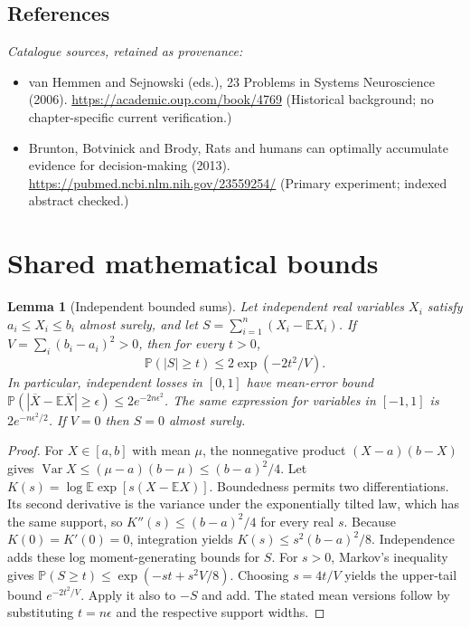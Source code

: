 \documentclass[11pt]{article}
\newcommand{\E}{\mathbb E}
\newcommand{\Prob}{\mathbb P}
\DeclareMathOperator{\Var}{Var}
\providecommand{\E}{\mathbb E}
\providecommand{\Prob}{\mathbb P}
\providecommand{\Var}{\operatorname{Var}}
\newtheorem{sharedlemma}{Lemma}[section]
\begin{document}
\subsection{References}
\noindent\emph{Catalogue sources, retained as provenance:}
\begin{itemize}
\item van Hemmen and Sejnowski (eds.), 23 Problems in Systems Neuroscience (2006). \url{https://academic.oup.com/book/4769} (Historical background; no chapter-specific current verification.)
\item Brunton, Botvinick and Brody, Rats and humans can optimally accumulate evidence for decision-making (2013). \url{https://pubmed.ncbi.nlm.nih.gov/23559254/} (Primary experiment; indexed abstract checked.)
\end{itemize}
\clearpage


\appendix
\section{Shared mathematical bounds}\label{app:bounds}
\begin{sharedlemma}[Independent bounded sums]\label{lem:bounded}
Let independent real variables $X_i$ satisfy $a_i\leq X_i\leq b_i$ almost surely,
and let $S=\sum_{i=1}^n(X_i-\E X_i)$. If
$V=\sum_i(b_i-a_i)^2>0$, then for every $t>0$,
\[
 \Prob(|S|\geq t)\leq 2\exp(-2t^2/V).
\]
In particular, independent losses in $[0,1]$ have mean-error bound
$\Prob(|\overline X-\E\overline X|\geq\epsilon)
\leq2e^{-2n\epsilon^2}$. The same expression for variables in $[-1,1]$
is $2e^{-n\epsilon^2/2}$. If $V=0$ then $S=0$ almost surely.
\end{sharedlemma}
\begin{proof}
For $X\in[a,b]$ with mean $\mu$, the nonnegative product
$(X-a)(b-X)$ gives
$\Var X\leq(\mu-a)(b-\mu)\leq(b-a)^2/4$.
Let $K(s)=\log\E\exp[s(X-\E X)]$.
Boundedness permits two differentiations. Its second derivative is the variance
under the exponentially tilted law, which has the same support, so
$K''(s)\leq(b-a)^2/4$ for every real $s$.
Because $K(0)=K'(0)=0$, integration yields
$K(s)\leq s^2(b-a)^2/8$.
Independence adds these log moment-generating bounds for $S$.
For $s>0$, Markov's inequality gives
$\Prob(S\geq t)\leq\exp(-st+s^2V/8)$.
Choosing $s=4t/V$ yields the upper-tail bound $e^{-2t^2/V}$.
Apply it also to $-S$ and add. The stated mean versions follow by substituting
$t=n\epsilon$ and the respective support widths.
\end{proof}
\end{document}
